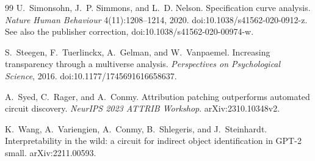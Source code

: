 \documentclass[11pt]{article}
\begin{document}
\begin{thebibliography}{99}
U.~Simonsohn, J.~P. Simmons, and L.~D. Nelson. Specification curve analysis.
\emph{Nature Human Behaviour} 4(11):1208--1214, 2020.
doi:10.1038/s41562-020-0912-z. See also the publisher correction,
doi:10.1038/s41562-020-00974-w.

S.~Steegen, F.~Tuerlinckx, A.~Gelman, and W.~Vanpaemel.
Increasing transparency through a multiverse analysis.
\emph{Perspectives on Psychological Science}, 2016.
doi:10.1177/1745691616658637.

A.~Syed, C.~Rager, and A.~Conmy.
Attribution patching outperforms automated circuit discovery.
\emph{NeurIPS 2023 ATTRIB Workshop}. arXiv:2310.10348v2.

K.~Wang, A.~Variengien, A.~Conmy, B.~Shlegeris, and J.~Steinhardt.
Interpretability in the wild: a circuit for indirect object identification in
GPT-2 small. arXiv:2211.00593.

\end{thebibliography}
\end{document}
